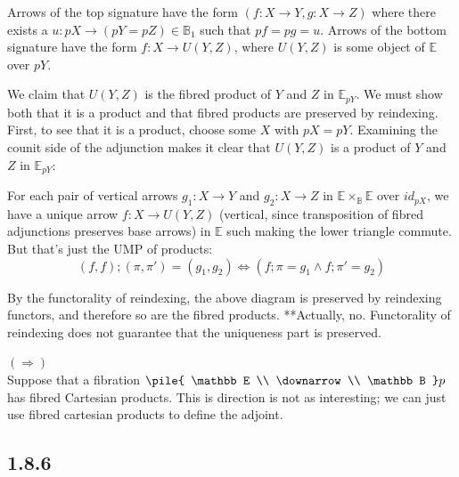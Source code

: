 \documentclass{article}
\newcommand{\vrt}[2]{
\pile{
#1 \\
\downarrow \\
#2
}
}
\begin{document}
Arrows of the top signature have the form $(f : X \to Y,g : X \to Z)$ where there exists a $u : pX \to (pY = pZ) \in \mathbb B_1$ such
that $pf = pg = u$. Arrows of the bottom signature have the form $f : X \to U(Y,Z)$, where $U(Y,Z)$ is some object of $\mathbb E$ over $pY$.

We claim that $U(Y,Z)$ is the fibred product of $Y$ and $Z$ in $\mathbb E_{pY}$. We must show both that it is a product and 
that fibred products are preserved by reindexing. First, to see that it is a product, choose some $X$ with $pX = pY$. 
Examining the counit side of the adjunction makes it clear that $U(Y,Z)$ is a product of $Y$ and $Z$ in $\mathbb E_{pY}$:

\begin{center}
\end{center}

For each pair of vertical arrows $g_1 : X \to Y$ and $g_2 : X \to Z$ in $\mathbb E \times_{\mathbb B} \mathbb E$ 
over $id_{pX}$, we have a unique arrow $f : X \to U(Y,Z)$ 
(vertical, since transposition of fibred adjunctions preserves base arrows) in 
$\mathbb E$ such making the lower triangle commute.
But that's just the UMP of products: 
$$(f,f);(\pi,\pi') = (g_1,g_2) \Leftrightarrow (f;\pi = g_1 \wedge f;\pi' = g_2)$$

By the functorality of reindexing, the above diagram is preserved by reindexing functors, and therefore
so are the fibred products. **Actually, no. Functorality of reindexing does not guarantee that the uniqueness part is 
preserved. 

$(\Rightarrow)$~\\ 

Suppose that a fibration $\vrt{\mathbb E}{\mathbb B}p$ has fibred Cartesian products. 
This is direction is not as interesting; we can just use fibred cartesian products to define the adjoint.


\subsection*{1.8.6}
\end{document}
